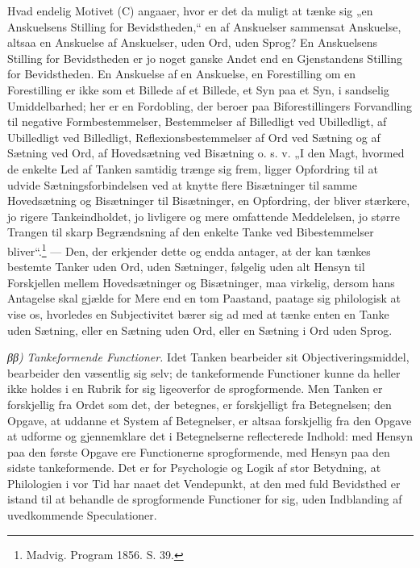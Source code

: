 \documentclass[12pt]{book}
\newcommand{\opage}[1]{\marginnote{\footnotesize\textit{[#1]}}}
\begin{document}
Hvad endelig Motivet (C) angaaer, hvor er det da muligt
\opage{42}at tænke sig „en Anskuelsens Stilling for Bevidstheden,“ en
af Anskuelser sammensat Anskuelse, altsaa en Anskuelse af
Anskuelser, uden Ord, uden Sprog? En Anskuelsens Stilling for
Bevidstheden er jo noget ganske Andet end en Gjenstandens
Stilling for Bevidstheden. En Anskuelse af en Anskuelse, en
Forestilling om en Forestilling er ikke som et Billede af et
Billede, et Syn paa et Syn, i sandselig Umiddelbarhed; her
er en Fordobling, der beroer paa Biforestillingers Forvandling
til negative Formbestemmelser, Bestemmelser af Billedligt ved
Ubilledligt, af Ubilledligt ved Billedligt, Reflexionsbestemmelser
af Ord ved Sætning og af Sætning ved Ord, af
Hovedsætning ved Bisætning o. s. v. „I den Magt, hvormed de
enkelte Led af Tanken samtidig trænge sig frem, ligger
Opfordring til at udvide Sætningsforbindelsen ved at knytte
flere Bisætninger til samme Hovedsætning og Bisætninger
til Bisætninger, en Opfordring, der bliver stærkere, jo rigere
Tankeindholdet, jo livligere og mere omfattende Meddelelsen,
jo større Trangen til skarp Begrændsning af den enkelte Tanke
ved Bibestemmelser bliver“.\footnote{%
Madvig. Program 1856. S. 39.} --- Den, der erkjender dette og
endda antager, at der kan tænkes bestemte Tanker uden Ord,
uden Sætninger, følgelig uden alt Hensyn til Forskjellen mellem
Hovedsætninger og Bisætninger, maa virkelig, dersom hans
Antagelse skal gjælde for Mere end en tom Paastand, paatage
sig philologisk at vise os, hvorledes en Subjectivitet bærer sig
ad med at tænke enten en Tanke uden Sætning, eller en
Sætning uden Ord, eller en Sætning i Ord uden Sprog.

\textit{ββ)} \emph{Tankeformende Functioner.} Idet Tanken
bearbeider sit Objectiveringsmiddel, bearbeider den væsentlig
sig selv; de tankeformende Functioner kunne da heller ikke
holdes i en Rubrik for sig ligeoverfor de sprogformende.
Men Tanken er forskjellig fra Ordet som det, der betegnes,
er forskjelligt fra Betegnelsen; den Opgave, at uddanne et
\opage{43}System af Betegnelser, er altsaa forskjellig fra den Opgave at
udforme og gjennemklare det i Betegnelserne reflecterede
Indhold: med Hensyn paa den første Opgave ere Functionerne
sprogformende, med Hensyn paa den sidste tankeformende.
Det er for Psychologie og Logik af stor Betydning, at
Philologien i vor Tid har naaet det Vendepunkt, at den med fuld
Bevidsthed er istand til at behandle de sprogformende Functioner
for sig, uden Indblanding af uvedkommende Speculationer.
\end{document}
